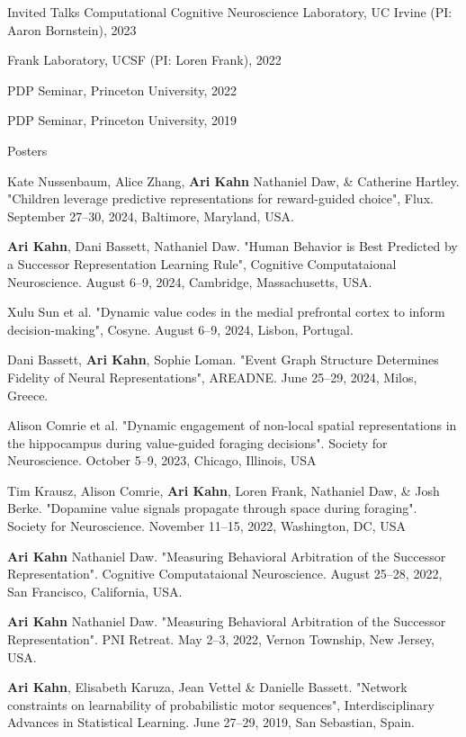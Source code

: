 \documentclass{resume} %
\begin{document}
\begin{rSection}{Invited Talks}
Computational Cognitive Neuroscience Laboratory, UC Irvine (PI: Aaron Bornstein), 2023

Frank Laboratory, UCSF (PI: Loren Frank), 2022

PDP Seminar, Princeton University, 2022

PDP Seminar, Princeton University, 2019

\begin{rSection}{Posters}

Kate Nussenbaum, Alice Zhang, \textbf{Ari Kahn} Nathaniel Daw, \& Catherine Hartley. "Children leverage predictive representations for reward-guided choice", Flux. September 27--30, 2024, Baltimore, Maryland, USA.

\textbf{Ari Kahn}, Dani Bassett, Nathaniel Daw. "Human Behavior is Best Predicted by a Successor Representation Learning Rule", Cognitive Computataional Neuroscience. August 6--9, 2024, Cambridge, Massachusetts, USA.

Xulu Sun et al. "Dynamic value codes in the medial prefrontal cortex to inform decision-making", Cosyne. August 6--9, 2024, Lisbon, Portugal.

Dani Bassett, \textbf{Ari Kahn}, Sophie Loman. "Event Graph Structure Determines Fidelity of Neural Representations", AREADNE. June 25--29, 2024, Milos, Greece.

Alison Comrie et al. "Dynamic engagement of non-local spatial representations in the hippocampus during value-guided foraging decisions". Society for Neuroscience. October 5--9, 2023, Chicago, Illinois, USA

Tim Krausz, Alison Comrie, \textbf{Ari Kahn}, Loren Frank, Nathaniel Daw, \& Josh Berke. "Dopamine value signals propagate through space during foraging". Society for Neuroscience. November 11--15, 2022, Washington, DC, USA

\textbf{Ari Kahn} Nathaniel Daw. "Measuring Behavioral Arbitration of the Successor Representation". Cognitive Computataional Neuroscience. August 25--28, 2022, San Francisco, California, USA.

\textbf{Ari Kahn} Nathaniel Daw. "Measuring Behavioral Arbitration of the Successor Representation". PNI Retreat. May 2--3, 2022, Vernon Township, New Jersey, USA.

\textbf{Ari Kahn}, Elisabeth Karuza, Jean Vettel \& Danielle Bassett. "Network constraints on learnability of probabilistic motor sequences", Interdisciplinary Advances in Statistical Learning. June 27--29, 2019, San Sebastian, Spain.


\end{rSection}
\end{rSection}
\end{document}
